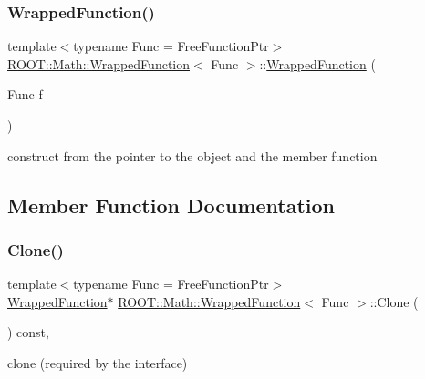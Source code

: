 \subsubsection{\texorpdfstring{WrappedFunction()}{WrappedFunction()}\hspace{0.1cm}{\footnotesize\ttfamily [2/2]}}
{\footnotesize\ttfamily template$<$typename Func  = Free\+Function\+Ptr$>$ \\
\mbox{\hyperlink{classROOT_1_1Math_1_1WrappedFunction}{R\+O\+O\+T\+::\+Math\+::\+Wrapped\+Function}}$<$ Func $>$\+::\mbox{\hyperlink{classROOT_1_1Math_1_1WrappedFunction}{Wrapped\+Function}} (\begin{DoxyParamCaption}\item[{Func}]{f }\end{DoxyParamCaption})\hspace{0.3cm}{\ttfamily [inline]}}

construct from the pointer to the object and the member function 

\subsection{Member Function Documentation}
\mbox{\label{classROOT_1_1Math_1_1WrappedFunction_a4ec89f0c717b0fc228ebe7d71e14b1ee}} 
\subsubsection{\texorpdfstring{Clone()}{Clone()}\hspace{0.1cm}{\footnotesize\ttfamily [1/2]}}
{\footnotesize\ttfamily template$<$typename Func  = Free\+Function\+Ptr$>$ \\
\mbox{\hyperlink{classROOT_1_1Math_1_1WrappedFunction}{Wrapped\+Function}}$\ast$ \mbox{\hyperlink{classROOT_1_1Math_1_1WrappedFunction}{R\+O\+O\+T\+::\+Math\+::\+Wrapped\+Function}}$<$ Func $>$\+::Clone (\begin{DoxyParamCaption}{ }\end{DoxyParamCaption}) const\hspace{0.3cm}{\ttfamily [inline]}, {\ttfamily [virtual]}}



clone (required by the interface) 



